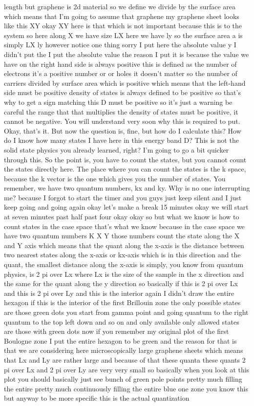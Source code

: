 length but graphene is 2d material so we define we divide by the surface area which means that I'm going to assume that graphene my graphene sheet looks like this XY okay XY here is that which is not important because this is to the system so here along X we have size LX here we have ly so the surface area a is simply LX ly however notice one thing sorry I put here the absolute value y I didn't put the I put the absolute value the reason I put it is because the value we have on the right hand side is always positive this is defined as the number of electrons it's a positive number or or holes it doesn't matter so the number of carriers divided by surface area which is positive which means that the left-hand side must be positive density of states is always defined to be positive so that's why to get a sign matching this D must be positive so it's just a warning be careful the range that that multiplies the density of states must be positive, it cannot be negative. You will understand very soon why this is required to put. Okay, that's it. But now the question is, fine, but how do I calculate this? How do I know how many states I have here in this energy band D? This is not the solid state physics you already learned, right? I'm going to go a bit quicker through this. So the point is, you have to count the states, but you cannot count the states directly here. The place where you can count the states is the k space, because the k vector is the one which gives you the number of states. You remember, we have two quantum numbers, kx and ky. Why is no one interrupting me? because I forgot to start the timer and you guys just keep silent and I just keep going and going again okay let's make a break 15 minutes okay we will start at seven minutes past half past four okay okay so but what we know is how to count states in the case space that's what we know because in the case space we have two quantum numbers K X Y those numbers count the state along the X and Y axis which means that the quant along the x-axis is the distance between two nearest states along the x-axis or kx-axis which is in this direction and the quant, the smallest distance along the x-axis is simply, you know from quantum physics, is 2 pi over Lx where Lx is the size of the sample in the x direction and the same for the quant along the y direction so basically if this is 2 pi over Lx and this is 2 pi over Ly and this is the interior again I didn't draw the entire hexagon if this is the interior of the first Brillouin zone the only possible states are those green dots you start from gamma point and going quantum to the right quantum to the top left down and so on and only available only allowed states are those with green dots now if you remember my original plot of the first Boulogne zone I put the entire hexagon to be green and the reason for that is that we are considering here microscopically large graphene sheets which means that Lx and Ly are rather large and because of that these quanta these quants 2 pi over Lx and 2 pi over Ly are very very small so basically when you look at this plot you should basically just see bunch of green pole points pretty much filling the entire pretty much continuously filling the entire blue one zone you know this but anyway to be more specific this is the actual quantization 